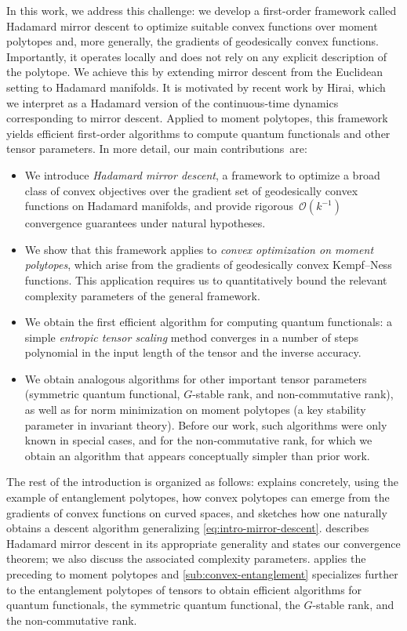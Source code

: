 \documentclass[11pt,letterpaper]{article}
\numberwithin{equation}{section}
\begin{document}
\medskip

In this work, we address this challenge: we develop a first-order framework called Hadamard mirror descent to optimize suitable convex functions over moment polytopes and, more generally, the gradients of geodesically convex functions.
Importantly, it operates locally and does not rely on any explicit description of the polytope.
We achieve this by extending mirror descent from the Euclidean setting to Hadamard manifolds.
It is motivated by recent work by Hirai, which we interpret as a Hadamard version of the continuous-time dynamics corresponding to mirror descent.
Applied to moment polytopes, this framework yields efficient first-order algorithms to compute quantum functionals and other tensor parameters.
In more detail, our main contributions~are:
\begin{itemize}
\item We introduce \emph{Hadamard mirror descent}, a framework to optimize a broad class of convex objectives over the gradient set of geodesically convex functions on Hadamard manifolds, and provide rigorous~$\mathcal O(k^{-1})$ convergence guarantees under natural hypotheses.
\item We show that this framework applies to \emph{convex optimization on moment polytopes}, which arise from the gradients of geodesically convex Kempf--Ness functions.
This application requires us to quantitatively bound the relevant complexity parameters of the general framework.
\item We obtain the first efficient algorithm for computing quantum functionals: a simple \emph{entropic tensor scaling} method converges in a number of steps polynomial in the input length of the tensor and the inverse accuracy.
\item We obtain analogous algorithms for other important tensor parameters (symmetric quantum functional, $G$-stable rank, and non-commutative rank), as well as for norm minimization on moment polytopes (a key stability parameter in invariant theory).
Before our work, such algorithms were only known in special cases, and for the non-commutative rank, for which we obtain an algorithm that appears conceptually simpler than prior work.
\end{itemize}
The rest of the introduction is organized as follows:
 explains concretely, using the example of entanglement polytopes, how convex polytopes can emerge from the gradients of convex functions on curved spaces, and sketches how one naturally obtains a descent algorithm generalizing \cref{eq:intro-mirror-descent}.
 describes Hadamard mirror descent in its appropriate generality and states our convergence theorem; we also discuss the associated complexity parameters.
 applies the preceding to moment polytopes and \cref{sub:convex-entanglement} specializes further to the entanglement polytopes of tensors to obtain efficient algorithms for quantum functionals, the symmetric quantum functional, the $G$-stable rank, and the non-commutative rank.
\end{document}
